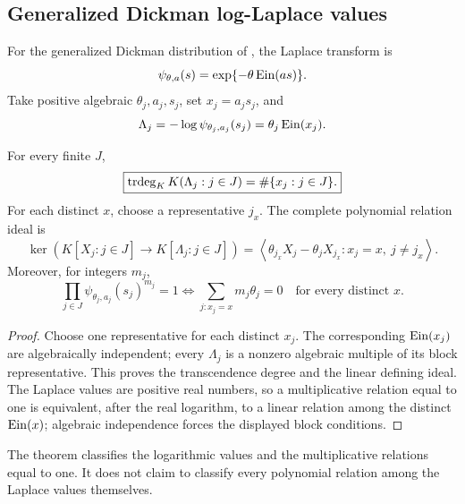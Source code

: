 \subsection*{Generalized Dickman log-Laplace values}

For the generalized Dickman distribution of
\cite{GrahovacEtAl2024}, the Laplace transform is
\begin{equation}\label{eq:Dickman-Laplace}
 \psi_{\theta,a}(s)=\exp\{-\theta\operatorname{Ein}(as)\}.
\end{equation}
Take positive algebraic \(\theta_j,a_j,s_j\), set \(x_j=a_js_j\), and
\[
 \Lambda_j=-\log\psi_{\theta_j,a_j}(s_j)=\theta_j\operatorname{Ein}(x_j).
\]

\begin{theorem}
\label{thm:Dickman-classification}
For every finite \(J\),
\begin{equation}\label{eq:Dickman-trdeg}
 \boxed{\displaystyle
 \operatorname{trdeg}_KK(\Lambda_j:j\in J)=\#\{x_j:j\in J\}.}
\end{equation}
For each distinct \(x\), choose a representative \(j_x\).  The complete
polynomial relation ideal is
\begin{equation}\label{eq:Dickman-relation-ideal}
 \ker\!\left(K[X_j:j\in J]\to K[\Lambda_j:j\in J]\right)
 =
 \left\langle
 \theta_{j_x}X_j-\theta_jX_{j_x}:
 x_j=x,\ j\ne j_x
 \right\rangle.
\end{equation}
Moreover,
for integers \(m_j\),
\begin{equation}\label{eq:Dickman-multiplicative}
 \boxed{\displaystyle
 \prod_{j\in J}\psi_{\theta_j,a_j}(s_j)^{m_j}=1
 \Longleftrightarrow
 \sum_{j:x_j=x}m_j\theta_j=0
 \quad\text{for every distinct }x.}
\end{equation}
\end{theorem}

\begin{proof}
Choose one representative for each distinct \(x_j\).  The corresponding
\(\operatorname{Ein}(x_j)\) are algebraically independent; every \(\Lambda_j\) is a nonzero
algebraic multiple of its block representative.  This proves the
transcendence degree and the linear defining ideal.  The Laplace values are
positive real numbers, so a multiplicative relation equal to one is
equivalent, after the real logarithm, to a linear relation among the
distinct \(\operatorname{Ein}(x)\); algebraic independence forces the displayed block
conditions.
\end{proof}

The theorem classifies the logarithmic values and the multiplicative
relations equal to one.  It does not claim to classify every polynomial
relation among the Laplace values themselves.

